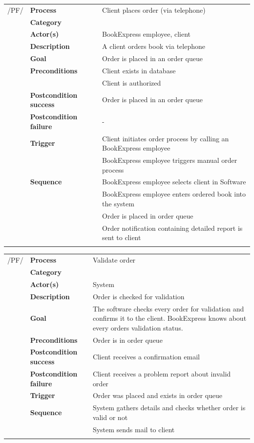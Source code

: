 \documentclass[11pt,a4paper,oneside,svgnames]{report}
\begin{document}
\noindent
\begin{tabular}{p{1.5cm}p{3cm}p{8cm}}
	 /PF/	& \textbf{Process} & Client places order (via telephone)\\ 
		& \textbf{Category} & \\
		& \textbf{Actor(s)} & BookExpress employee, client\\ 
		& \textbf{Description}	 & A client orders book via telephone\\ 
		& \textbf{Goal} & Order is placed in an order queue\\
		& \textbf{Preconditions} & Client exists in database\\
		& & Client is authorized\\
		& \textbf{Postcondition success} & Order is placed in an order queue\\
		& \textbf{Postcondition failure} & -\\
		& \textbf{Trigger} & Client initiates order process by calling an BookExpress employee\\
		& & BookExpress employee triggers manual order process\\
		& \textbf{Sequence} & BookExpress employee selects client in Software\\
		& & BookExpress employee enters ordered book into the system\\
		& & Order is placed in order queue\\
		& & Order notification containing detailed report is sent to client\\
\hfill \\
\end{tabular}

\noindent
\begin{tabular}{p{1.5cm}p{3cm}p{8cm}}
	 /PF/	& \textbf{Process} & Validate order\\ 
		& \textbf{Category} & \\
		& \textbf{Actor(s)} & System\\ 
		& \textbf{Description}	 & Order is checked for validation\\ 
		& \textbf{Goal} & The software checks every order for validation and confirms it to the client. BookExpress knows about every orders validation status.\\
		& \textbf{Preconditions} & Order is in order queue\\
		& \textbf{Postcondition success} & Client receives a confirmation email\\
		& \textbf{Postcondition failure} & Client receives a problem report about invalid order\\
		& \textbf{Trigger} & Order was placed and exists in order queue\\
		& \textbf{Sequence} & System  gathers details and checks whether order is valid or not\\
		& & System sends mail to client\\
\hfill \\
\end{tabular}
\end{document}
